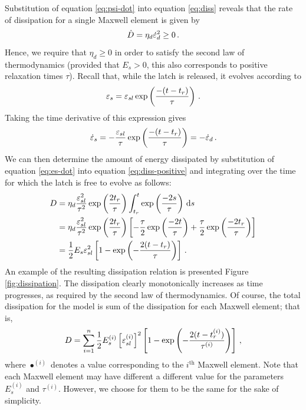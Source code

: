 \documentclass{article}
\begin{document}
Substitution of equation \eqref{eq:psi-dot} into equation \eqref{eq:diss} reveals that the rate of dissipation for a single Maxwell element is given by
\begin{equation}
	\dot{D} =  \eta_d\dot{\varepsilon}_{d}^{2}\geq 0\,.
	\label{eq:diss-positive}
\end{equation}
Hence, we require that $\eta_d\geq 0$ in order to satisfy the second law of thermodynamics (provided that $E_{s}> 0$, this also corresponds to positive relaxation times $\tau$). Recall that, while the latch is released, it evolves according to 
\begin{equation}
	\varepsilon_{s} = \varepsilon_{sl}\exp\left(\dfrac{-(t-t_{r})}{\tau}\right)\,.
\end{equation}
Taking the time derivative of this expression gives
\begin{equation}
	\dot{\varepsilon}_{s} = -\dfrac{\varepsilon_{sl}}{\tau}\exp\left(\dfrac{-(t-t_{r})}{\tau}\right)=-\dot{\varepsilon}_{d}\,.
	\label{eq:es-dot}
\end{equation}
We can then determine the amount of energy dissipated by substitution of equation \eqref{eq:es-dot} into equation \eqref{eq:diss-positive} and integrating over the time for which the latch is free to evolve as follows:
\begin{equation}
	\begin{aligned}
			D &=  \eta_d\dfrac{\varepsilon_{sl}^{2}}{\tau^{2}}\exp\left(\dfrac{2t_{r}}{\tau}\right)\int_{t_r}^{t} \exp\left(\dfrac{-2s}{\tau}\right)\,\text{d} s\\
			&=\eta_d\dfrac{\varepsilon_{sl}^{2}}{\tau^{2}}\exp\left(\dfrac{2t_{r}}{\tau}\right)\left[-\dfrac{\tau}{2}\exp\left(\dfrac{-2t}{\tau}\right)+\dfrac{\tau}{2}\exp\left(\dfrac{-2t_r}{\tau}\right)\right] \\
			& = \dfrac{1}{2}E_{s}\varepsilon_{sl}^{2}\left[1 - \exp\left(-\dfrac{2(t-t_{r})}{\tau}\right)\right]\,.
	\end{aligned}
\end{equation}
An example of the resulting dissipation relation is presented Figure \ref{fig:dissipation}.
The dissipation clearly monotonically increases as time progresses, as required by the second law of thermodynamics. Of course, the total dissipation for the model is sum of the dissipation for each Maxwell element; that is,
\begin{equation}
	D = \sum_{i=1}^{n}\dfrac{1}{2}E_{s}^{(i)}\left[\varepsilon^{(i)}_{sl}\right]^{2}\left[1 - \exp\left(-\dfrac{2(t-t^{(i)}_{r})}{\tau^{(i)}}\right)\right]\,,
\end{equation}
where $\bullet^{(i)}$ denotes a value corresponding to the $i^{\text{th}}$ Maxwell element. Note that each Maxwell element may have different a different value for the parameters $E^{(i)}_{s}$ and $\tau^{(i)}$. However, we choose for them to be the same for the sake of simplicity. 
\end{document}
